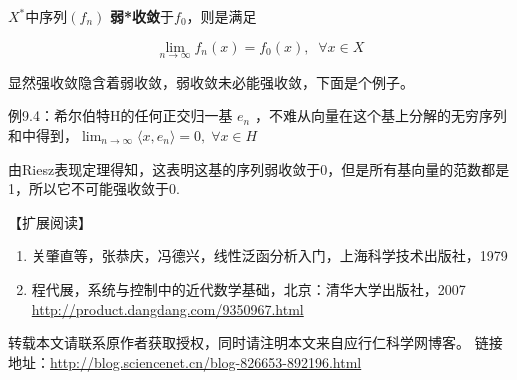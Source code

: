 $ X^* $中序列$ (f_n) $ \textbf{弱*收敛}于$ f_0 $，则是满足

\[\lim_{n\rightarrow\infty}f_n(x) = f_0(x),\;\; \forall x \in X\]

显然强收敛隐含着弱收敛，弱收敛未必能强收敛，下面是个例子。

\kaishu\setlength{\leftskip}{1em}

例9.4：希尔伯特H的任何正交归一基{ $ e_n $ }，不难从向量在这个基上分解的无穷序列和中得到，$ \lim_{n\rightarrow\infty}\langle x,e_n \rangle =0,\;\forall x\in H $

由Riesz表现定理得知，这表明这基的序列弱收敛于0，但是所有基向量的范数都是1，所以它不可能强收敛于0.

\songti\setlength{\leftskip}{0em}


【扩展阅读】

\begin{enumerate}
	\item 关肇直等，张恭庆，冯德兴，线性泛函分析入门，上海科学技术出版社，1979
	
	\item 程代展，系统与控制中的近代数学基础，北京：清华大学出版社，2007 \url{http://product.dangdang.com/9350967.html}
	

\end{enumerate}


	转载本文请联系原作者获取授权，同时请注明本文来自应行仁科学网博客。
链接地址：\url{http://blog.sciencenet.cn/blog-826653-892196.html }